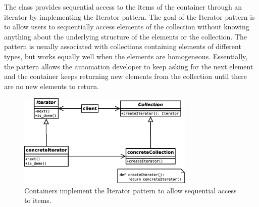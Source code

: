 

%

The  class provides sequential access to the items of the
container through an iterator by implementing the Iterator pattern. The goal of
the Iterator pattern is to allow users to sequentially access elements of the
collection without knowing anything about the underlying structure of the
elements or the collection. The pattern is usually associated with collections
containing elements of different types, but works equally well when the
elements are homogeneous. Essentially, the pattern allows the automation
developer to keep asking for the next element and the container keeps returning
new elements from the collection until there are no new elements to return.


\begin{figure}[tbh]
  \centering
  \includegraphics[width=0.75\textwidth]
    {../../diagrams/iterator_pattern.png}
  \caption{ Containers implement the Iterator pattern to allow sequential %
            access to items. }
  \label{fig:iterator_pattern}
\end{figure}


